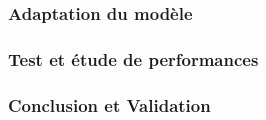 		\subsubsection{Adaptation du modèle}
		\subsubsection{Test et étude de performances}
		\subsubsection{Conclusion et Validation}
		
